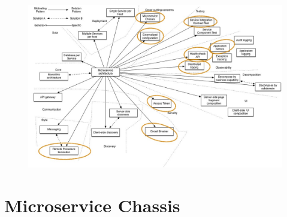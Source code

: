 \documentclass[aspectratio=169]{beamer}
\begin{document}
\begin{frame}{}
	\begin{figure}
		\centering
		\includegraphics[width=\linewidth]{Images/PatternsRelatedToMicroservices2}
	\end{figure}
\end{frame}



{
	\section{Microservice Chassis}
}
\end{document}
